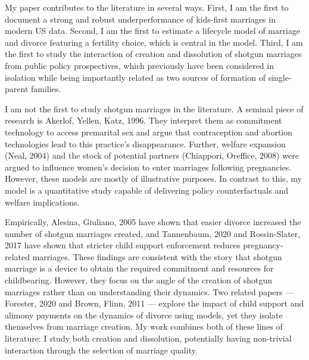 \documentclass[12pt,letter]{article}
\begin{document}
My paper contributes to the literature in several ways. First, I am the first to document a strong and robust underperformance of kids-first marriages in modern US data. Second, I am the first to estimate a lifecycle model of marriage and divorce featuring a fertility choice, which is central in the model. Third, I am the first to study the interaction of creation and dissolution of shotgun marriages from public policy prospectives, which previously have been considered in isolation while being importantly related as two sources of formation of single-parent families.

I am not the first to study shotgun marriages in the literature. A seminal piece of research is Akerlof, Yellen, Katz, 1996\nocite{akerlof1996analysis}. They interpret them as commitment technology to access premarital sex and argue that contraception and abortion technologies lead to this practice's disappearance. Further, welfare expansion (Neal, 2004\nocite{neal2004relationship}) and the stock of potential partners (Chiappori, Oreffice, 2008\nocite{chiappori2008birth}) were argued to influence women's decision to enter marriages following pregnancies. However, these models are mostly of illustrative purposes. In contrast to this, my model is a quantitative study capable of delivering policy counterfactuals and welfare implications.

Empirically, Alesina, Giuliano, 2005\nocite{alesina2006divorce} have shown that easier divorce increased the number of shotgun marriages created, and Tannenbaum, 2020\nocite{tannenbaum2020effect} and Rossin-Slater, 2017\nocite{rossin2017signing} have shown that stricter child support enforcement reduces pregnancy-related marriages. These findings are consistent with the story that shotgun marriage is a device to obtain the required commitment and resources for childbearing. However, they focus on the angle of the creation of shotgun marriages rather than on understanding their dynamics. Two related papers --- Forester, 2020\nocite{foerster2020untying} and Brown, Flinn, 2011\nocite{brown2011family} --- explore the impact of child support and alimony payments on the dynamics of divorce using models, yet they isolate themselves from marriage creation. My work combines both of these lines of literature: I study both creation and dissolution, potentially having non-trivial interaction through the selection of marriage quality.
\end{document}
